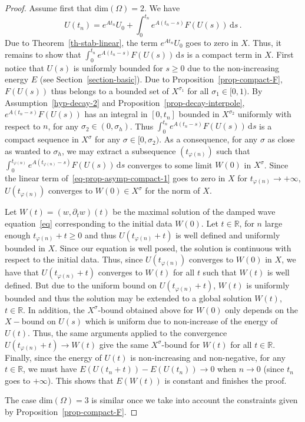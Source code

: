 \documentclass[11pt]{article}
\theoremstyle{definition}
\numberwithin{equation}{section}
\numberwithin{figure}{section}
\numberwithin{table}{section}
\newcommand{\RR}{\mathbb{R}}
\newcommand{\drm}{\mathrm{d}}
\begin{document}
\begin{proof}
Assume first that dim$(\Omega)=2$. We have
\begin{equation}\label{eq-prop-asymp-compact-1}
U(t_n)=e^{At_n}U_0 + \int_0^{t_n} e^{A(t_n-s)}F(U(s))\,\drm s\,.
\end{equation}
Due to Theorem~\ref{th-stab-linear}, the term $e^{At_n}U_0$ goes to zero in $X$. Thus, it remains to show that $\int_0^{t_n} e^{A(t_n-s)}F(U(s))\,\drm s$ is a compact term in $X$. First notice that $U(s)$ is uniformly bounded for $s\geq 0$ due to the non-increasing energy $E$ (see Section~\ref{section-basic}). Due to Proposition~\ref{prop-compact-F}, $F(U(s))$ thus belongs to a bounded set of $X^{\sigma_1}$ for all $\sigma_1\in [0,1)$. By Assumption~\eqref{hyp-decay-2} and Proposition~\ref{prop-decay-interpole}, $e^{A(t_n-s)}F(U(s))$ has an integral in $[0,t_n]$ bounded in $X^{\sigma_2}$ uniformly with respect to $n$, for any $\sigma_2 \in (0,\sigma_h)$. Thus $\int_0^{t_n} e^{A(t_n-s)}F(U(s))\,\drm s$ is a compact sequence in $X^\sigma$ for any $\sigma\in [0,\sigma_2)$. As a consequence, for any $\sigma$ as close as wanted to $\sigma_h$, we may extract a subsequence $(t_{\varphi(n)})$ such that $\int_0^{t_{\varphi(n)}} e^{A(t_{\varphi(n)}-s)}F(U(s))\,\drm s$ converges to some limit $W(0)$ in $X^\sigma$. Since the linear term of~\eqref{eq-prop-asymp-compact-1} goes to zero in $X$ for $t_{\varphi(n)}\rightarrow +\infty$, $U(t_{\varphi(n)})$ converges to $W(0)\in X^\sigma$ for the norm of $X$.

Let $W(t)=(w,\partial_t w)(t)$ be the maximal solution of the damped wave equation~\eqref{eq} corresponding to the initial data $W(0)$. Let $t\in\RR$, for $n$ large enough $t_{\varphi(n)}+t\geq 0$ and thus $U(t_{\varphi(n)}+t)$ is well defined and uniformly bounded in $X$. Since our equation is well posed, the solution is continuous with respect to the initial data. Thus, since $U(t_{\varphi(n)})$ converges to $W(0)$ in $X$, we have that $U(t_{\varphi(n)}+t)$ converges to $W(t)$ for all $t$ such that $W(t)$ is well defined. But due to the uniform bound on $U(t_{\varphi(n)}+t)$, $W(t)$ is uniformly bounded and thus the solution may be extended to a global solution $W(t)$, $t\in\RR$. In addition, the $X^\sigma$-bound obtained above for $W(0)$ only depends on the $X-$bound on $U(s)$ which is uniform due to non-increase of the energy of $U(t)$. Thus, the same arguments applied to the convergence $U(t_{\varphi(n)}+t)\rightarrow W(t)$ give the same $X^\sigma$-bound for $W(t)$ for all $t\in\RR$. Finally, since the energy of $U(t)$ is non-increasing and non-negative, for any $t\in\RR$, we must have $E(U(t_n+t))-E(U(t_n))\rightarrow 0$ when $n\rightarrow 0$ (since $t_n$ goes to $+\infty$). This shows that $E(W(t))$ is constant and finishes the proof.

The case dim$(\Omega)=3$ is similar once we take into account the constraints given by Proposition~\ref{prop-compact-F}.
\end{proof}
\end{document}
